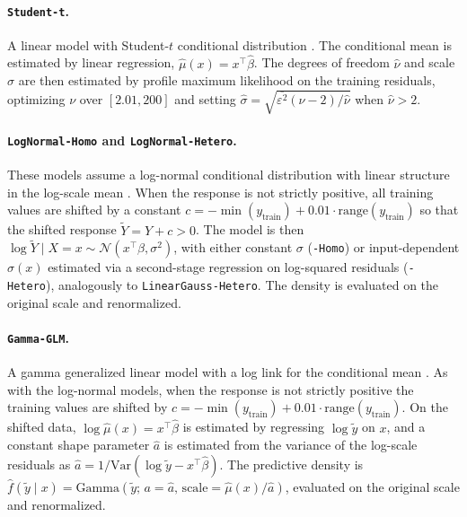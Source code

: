 \documentclass{article}
\newcommand{\method}[1]{\texttt{#1}}
\begin{document}
\paragraph{\method{Student-t}.}
A linear model with Student-$t$ conditional distribution
\citep{rigby2005generalized,kneib2023rage,klein2024distributional}. The
conditional mean is estimated by linear regression,
$\hat\mu(x)=x^\top\hat\beta$. The degrees of freedom $\hat\nu$ and scale
$\hat\sigma$ are then estimated by profile maximum likelihood on the training
residuals, optimizing $\nu$ over $[2.01,200]$ and setting
$\hat\sigma=\sqrt{\overline{\varepsilon^2}(\hat\nu-2)/\hat\nu}$ when
$\hat\nu>2$.

\paragraph{\method{LogNormal-Homo} and \method{LogNormal-Hetero}.}
These models assume a log-normal conditional distribution with linear structure
in the log-scale mean \citep{rigby2005generalized,kneib2023rage}. When the
response is not strictly positive, all training values are shifted by a
constant
$c=-\min(y_{\text{train}})+0.01\cdot\mathrm{range}(y_{\text{train}})$
so that the shifted response $\tilde Y=Y+c>0$. The model is then
$\log \tilde Y\mid X=x \sim \mathcal N(x^\top\beta,\sigma^2)$, with either
constant $\sigma$ (\method{-Homo}) or input-dependent $\sigma(x)$ estimated via
a second-stage regression on log-squared residuals (\method{-Hetero}),
analogously to \method{LinearGauss-Hetero}. The density is evaluated on the
original scale and renormalized.

\paragraph{\method{Gamma-GLM}.}
A gamma generalized linear model with a log link for the conditional mean
\citep{rigby2005generalized,kneib2023rage,klein2024distributional}. As with
the log-normal models, when the response is not strictly positive the training
values are shifted by
$c=-\min(y_{\text{train}})+0.01\cdot\mathrm{range}(y_{\text{train}})$. On the
shifted data, $\log \hat\mu(x)=x^\top\hat\beta$ is estimated by regressing
$\log\tilde y$ on $x$, and a constant shape parameter $\hat a$ is estimated
from the variance of the log-scale residuals as
$\hat a=1/\mathrm{Var}(\log\tilde y-x^\top\hat\beta)$. The predictive density
is
$\hat f(\tilde y\mid x)=\mathrm{Gamma}(\tilde y;\,a=\hat a,\,
\mathrm{scale}=\hat\mu(x)/\hat a)$, evaluated on the original scale and
renormalized.
\end{document}
